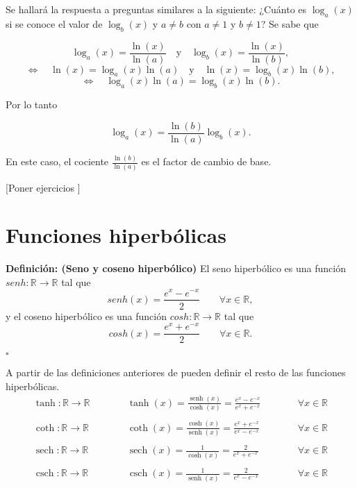 \documentclass[pts12]{article}
\numberwithin{equation}{section}
\DeclareMathOperator{\sech}{sech}
\DeclareMathOperator{\senh}{senh}
\DeclareMathOperator{\csch}{csch}
\newcommand{\Col}{\color{ProcessBlue}}
\begin{document}
Se hallará la respuesta a preguntas similares a la siguiente: ¿Cuánto es $\log_a(x)$ si se conoce el valor de $\log_b(x)$ y $a\neq b$ con $a\neq 1$ y $b\neq 1$? Se sabe que 

$$\log_a(x)=\frac{\ln(x)}{\ln(a)} \quad \mbox{y} \quad \log_b(x)=\frac{\ln(x)}{\ln(b)},$$
$$\Leftrightarrow \quad \ln(x)=\log_a(x)\ln(a) \quad \mbox{y} \quad \ln(x)=\log_b(x)\ln(b), $$
$$\Leftrightarrow \quad \log_a(x)\ln(a)=\log_b(x)\ln(b).$$

Por lo tanto

$$\log_a(x)= \frac{\ln(b)}{\ln(a)}\log_b(x).$$

En este caso, el cociente $\frac{\ln(b)}{\ln(a)}$ es el factor de cambio de base.

[Poner ejercicios ]

\section{\Col Funciones hiperbólicas}

\textbf{Definición: (Seno y coseno hiperbólico)} El seno hiperbólico es una función $senh:\mathbb{R}\rightarrow\mathbb{R}$ tal que 
$$senh(x)=\frac{e^x-e^{-x}}{2}\quad\quad\forall x\in\mathbb{R},$$
y el coseno hiperbólico es una función $cosh:\mathbb{R}\rightarrow\mathbb{R}$ tal que 
$$cosh(x)=\frac{e^x+e^{-x}}{2}\quad\quad\forall x\in\mathbb{R}.$$

\begin{flushright}
    $\square$
\end{flushright}

\noindent A partir de las definiciones anteriores de pueden definir el resto de las funciones hiperbólicas.
$$\begin{array}{lll}
    \tanh:\mathbb{R}\rightarrow\mathbb{R}\quad\quad\quad & \tanh(x)=\frac{\senh(x)}{\cosh(x)}=\frac{e^x-e^{-x}}{e^x+e^{-x}}\quad\quad\quad & \forall x\in\mathbb{R} \\
    \\
    \coth:\mathbb{R}\rightarrow\mathbb{R}\quad\quad\quad & \coth(x)=\frac{\cosh(x)}{\senh(x)}=\frac{e^x+e^{-x}}{e^x-e^{-x}}\quad\quad\quad & \forall x\in\mathbb{R} \\
    \\
    \sech:\mathbb{R}\rightarrow\mathbb{R}\quad\quad\quad & \sech(x)=\frac{1}{\cosh(x)}=\frac{2}{e^x+e^{-x}}\quad\quad\quad & \forall x\in\mathbb{R} \\
    \\
    \csch:\mathbb{R}\rightarrow\mathbb{R}\quad\quad\quad & \csch(x)=\frac{1}{\senh(x)}=\frac{2}{e^x-e^{-x}}\quad\quad\quad & \forall x\in\mathbb{R} \\
\end{array}$$
\end{document}
